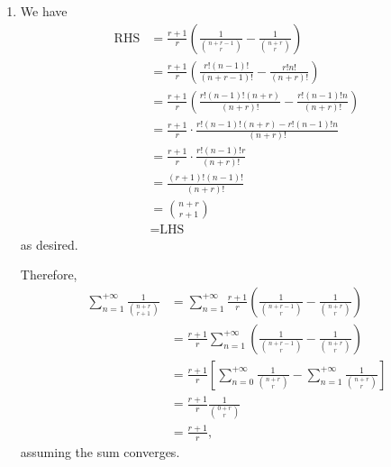 \Question{\currfilebase}

\begin{enumerate}
    \item We have
          \begin{align*}
              \text{RHS} & = \frac{r+1}{r} \left(\frac{1}{\binom{n+r-1}{r}} - \frac{1}{\binom{n+r}{r}}\right)       \\
                         & = \frac{r+1}{r} \left(\frac{r! (n-1)!}{(n+r-1)!} - \frac{r! n!}{(n+r)!}\right)           \\
                         & = \frac{r+1}{r} \left(\frac{r! (n-1)! (n+r)}{(n+r)!} - \frac{r! (n-1)! n}{(n+r)!}\right) \\
                         & = \frac{r+1}{r} \cdot \frac{r! (n-1)! (n+r) - r! (n-1)! n}{(n+r)!}                       \\
                         & = \frac{r+1}{r} \cdot \frac{r! (n-1)! r}{(n+r)!}                                         \\
                         & = \frac{(r+1)! (n-1)! }{(n+r)!}                                                          \\
                         & = \binom{n+r}{r+1}                                                                       \\
                         & = \text{LHS}
          \end{align*}
          as desired.

          Therefore,
          \begin{align*}
              \sum_{n = 1}^{+\infty} \frac{1}{\binom{n+r}{r+1}} & = \sum_{n = 1}^{+\infty} \frac{r+1}{r} \left(\frac{1}{\binom{n+r-1}{r}} - \frac{1}{\binom{n+r}{r}}\right)                          \\
                                                                & = \frac{r+1}{r} \sum_{n = 1}^{+\infty} \left(\frac{1}{\binom{n+r-1}{r}} - \frac{1}{\binom{n+r}{r}}\right)                          \\
                                                                & = \frac{r+1}{r} \left[\sum_{n = 0}^{+\infty} \frac{1}{\binom{n + r}{r}} - \sum_{n = 1}^{+\infty} \frac{1}{\binom{n + r}{r}}\right] \\
                                                                & = \frac{r+1}{r} \frac{1}{\binom{0+r}{r}}                                                                                           \\
                                                                & = \frac{r+1}{r},
          \end{align*}
          assuming the sum converges.


\end{enumerate}
